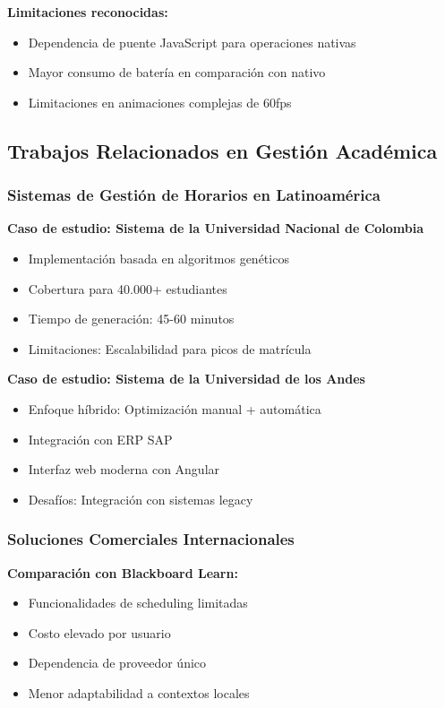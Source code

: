 \textbf{Limitaciones reconocidas:}
\begin{itemize}
\item Dependencia de puente JavaScript para operaciones nativas
\item Mayor consumo de batería en comparación con nativo
\item Limitaciones en animaciones complejas de 60fps
\end{itemize}

\subsection{Trabajos Relacionados en Gestión Académica}

\subsubsection{Sistemas de Gestión de Horarios en Latinoamérica}

\textbf{Caso de estudio: Sistema de la Universidad Nacional de Colombia}
\begin{itemize}
\item Implementación basada en algoritmos genéticos
\item Cobertura para 40.000+ estudiantes
\item Tiempo de generación: 45-60 minutos
\item Limitaciones: Escalabilidad para picos de matrícula
\end{itemize}

\textbf{Caso de estudio: Sistema de la Universidad de los Andes}
\begin{itemize}
\item Enfoque híbrido: Optimización manual + automática
\item Integración con ERP SAP
\item Interfaz web moderna con Angular
\item Desafíos: Integración con sistemas legacy
\end{itemize}

\subsubsection{Soluciones Comerciales Internacionales}

\textbf{Comparación con Blackboard Learn:}
\begin{itemize}
\item Funcionalidades de scheduling limitadas
\item Costo elevado por usuario
\item Dependencia de proveedor único
\item Menor adaptabilidad a contextos locales
\end{itemize}

